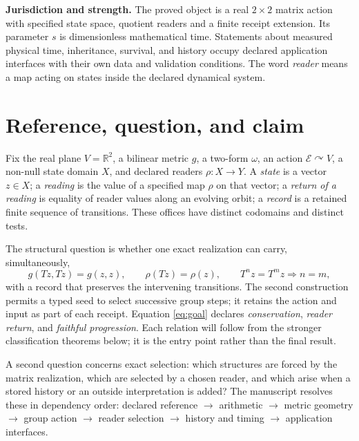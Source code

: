 \documentclass[10pt,letterpaper]{article}
\theoremstyle{definition}\newtheorem{definition}[theorem]{Definition}
\newcommand{\RR}{\mathbb R}
\newcommand{\aE}{\mathcal E}
\begin{document}
\vspace{2pt}
\noindent\textbf{Jurisdiction and strength.} The proved object is a real $2\times2$ matrix action with specified state space, quotient readers and a finite receipt extension. Its parameter $s$ is dimensionless mathematical time. Statements about measured physical time, inheritance, survival, and history occupy declared application interfaces with their own data and validation conditions. The word \emph{reader} means a map acting on states inside the declared dynamical system.

\section{Reference, question, and claim}
Fix the real plane $V=\RR^2$, a bilinear metric $g$, a two-form $\omega$, an action $\aE\curvearrowright V$, a non-null state domain $X$, and declared readers $\rho:X\to Y$. A \emph{state} is a vector $z\in X$; a \emph{reading} is the value of a specified map $\rho$ on that vector; a \emph{return of a reading} is equality of reader values along an evolving orbit; a \emph{record} is a retained finite sequence of transitions. These offices have distinct codomains and distinct tests.

The structural question is whether one exact realization can carry, simultaneously,
\begin{equation}\label{eq:goal}
 g(Tz,Tz)=g(z,z),\qquad \rho(Tz)=\rho(z),\qquad
 T^nz=T^mz\Longrightarrow n=m,
\end{equation}
with a record that preserves the intervening transitions. The second construction permits a typed seed to select successive group steps; it retains the action and input as part of each receipt. Equation \eqref{eq:goal} declares \emph{conservation}, \emph{reader return}, and \emph{faithful progression}. Each relation will follow from the stronger classification theorems below; it is the entry point rather than the final result.

A second question concerns exact selection: which structures are forced by the matrix realization, which are selected by a chosen reader, and which arise when a stored history or an outside interpretation is added? The manuscript resolves these in dependency order: declared reference $\to$ arithmetic $\to$ metric geometry $\to$ group action $\to$ reader selection $\to$ history and timing $\to$ application interfaces.
\end{document}
